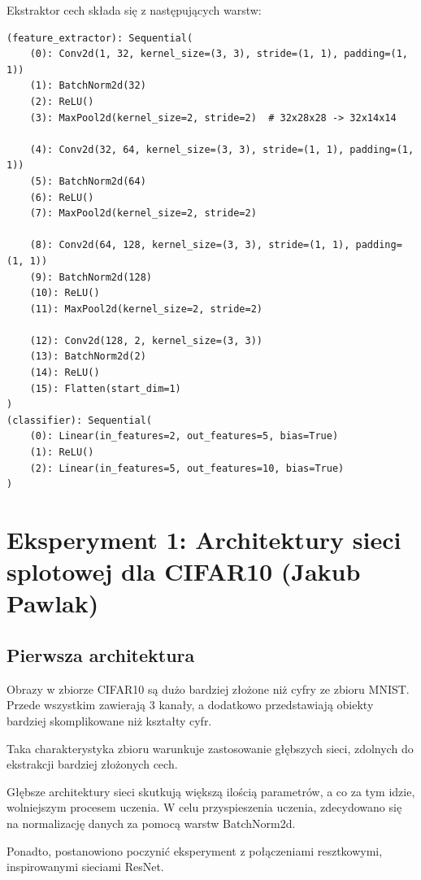 \documentclass[10pt]{article}
\begin{document}
Ekstraktor cech składa się z następujących warstw:

\tiny
\begin{verbatim}
(feature_extractor): Sequential(
    (0): Conv2d(1, 32, kernel_size=(3, 3), stride=(1, 1), padding=(1, 1))
    (1): BatchNorm2d(32)
    (2): ReLU()
    (3): MaxPool2d(kernel_size=2, stride=2)  # 32x28x28 -> 32x14x14

    (4): Conv2d(32, 64, kernel_size=(3, 3), stride=(1, 1), padding=(1, 1))
    (5): BatchNorm2d(64)
    (6): ReLU()
    (7): MaxPool2d(kernel_size=2, stride=2)

    (8): Conv2d(64, 128, kernel_size=(3, 3), stride=(1, 1), padding=(1, 1))
    (9): BatchNorm2d(128)
    (10): ReLU()
    (11): MaxPool2d(kernel_size=2, stride=2)

    (12): Conv2d(128, 2, kernel_size=(3, 3))
    (13): BatchNorm2d(2)
    (14): ReLU()
    (15): Flatten(start_dim=1)
)
(classifier): Sequential(
    (0): Linear(in_features=2, out_features=5, bias=True)
    (1): ReLU()
    (2): Linear(in_features=5, out_features=10, bias=True)
)
\end{verbatim}
\normalsize




\pagebreak
\section{Eksperyment 1: Architektury sieci splotowej dla CIFAR10 (Jakub Pawlak)}\label{sec:ex1-pawlak_cifar}

\subsection*{Pierwsza architektura}

\kubaCifarLarge{}

Obrazy w zbiorze CIFAR10 są dużo bardziej złożone niż cyfry ze zbioru MNIST\@.
Przede wszystkim zawierają 3 kanały, a dodatkowo przedstawiają obiekty bardziej skomplikowane niż kształty cyfr.

Taka charakterystyka zbioru warunkuje zastosowanie głębszych sieci, zdolnych do ekstrakcji bardziej złożonych cech.

Głębsze architektury sieci skutkują większą ilością parametrów, a co za tym idzie, wolniejszym procesem uczenia.
W celu przyspieszenia uczenia, zdecydowano się na normalizację danych za pomocą warstw BatchNorm2d.

Ponadto, postanowiono poczynić eksperyment z połączeniami resztkowymi, inspirowanymi sieciami ResNet.
\end{document}
